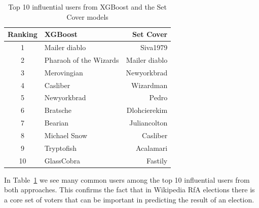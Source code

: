 \begin{table}[!ht]
    \centering
    \caption{Top 10 influential users from XGBoost and the Set Cover models}
    \label{tab:top-10}
    \begin{tabular}{clr}
        \toprule
        Ranking&XGBoost&Set Cover\\
        \midrule
        1& Mailer diablo & Siva1979\\
        2&Pharaoh of the Wizards&Mailer diablo\\
        3&Merovingian&Newyorkbrad\\
        4&Casliber&Wizardman\\
        5&Newyorkbrad&Pedro\\
        6&Bratsche&Dlohcierekim\\
        7&Bearian&Juliancolton\\
        8&Michael Snow&Casliber\\
        9&Tryptofish&Acalamari\\
        10&GlassCobra&Fastily\\
        \bottomrule
    \end{tabular}
\end{table}
In Table~\ref{tab:top-10} we see many common users among the top 10 influential users from both approaches. This confirms the fact that in Wikipedia RfA elections there is a core set of voters that can be important in predicting the result of an election.